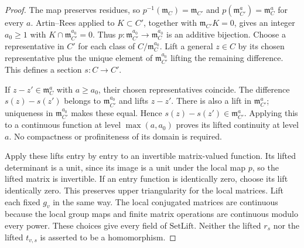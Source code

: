 \begin{proof}
The map preserves residues, so
\(p^{-1}(\mathfrak m_C)=\mathfrak m_{C'}\) and
\(p(\mathfrak m_{C'}^a)=\mathfrak m_C^a\) for every \(a\).
Artin--Rees applied to \(K\subset C'\), together with
\(\mathfrak m_{C'}K=0\), gives an integer \(a_0\ge1\)
with \(K\cap\mathfrak m_{C'}^{a_0}=0\).  Thus
\(p:\mathfrak m_{C'}^{a_0}\to\mathfrak m_C^{a_0}\) is an
additive bijection.  Choose a representative in \(C'\) for
each class of \(C/\mathfrak m_C^{a_0}\).  Lift a general
\(z\in C\) by its chosen representative plus the unique
element of \(\mathfrak m_{C'}^{a_0}\) lifting the remaining
difference.  This defines a section \(s:C\to C'\).

If \(z-z'\in\mathfrak m_C^a\) with \(a\ge a_0\), their
chosen representatives coincide.  The difference \(s(z)-s(z')\)
belongs to \(\mathfrak m_{C'}^{a_0}\) and lifts \(z-z'\).
There is also a lift in \(\mathfrak m_{C'}^a\); uniqueness
in \(\mathfrak m_{C'}^{a_0}\) makes these equal.  Hence
\(s(z)-s(z')\in\mathfrak m_{C'}^a\).  Applying this to a
continuous function at level \(\max(a,a_0)\) proves its lifted
continuity at level \(a\).  No compactness or profiniteness of
its domain is required.

Apply these lifts entry by entry to an invertible matrix-valued
function.  Its lifted determinant is a unit, since its image is
a unit under the local map \(p\), so the lifted matrix is
invertible.  If an entry function is identically zero, choose
its lift identically zero.  This preserves upper triangularity
for the local matrices.  Lift each fixed \(g_v\) in the same
way.  The local conjugated matrices are continuous because the
local group maps and finite matrix operations are continuous
modulo every power.  These choices give every field of
\(\mathrm{SetLift}\).  Neither the lifted \(r_s\) nor the
lifted \(t_{v,s}\) is asserted to be a homomorphism.
\end{proof}

